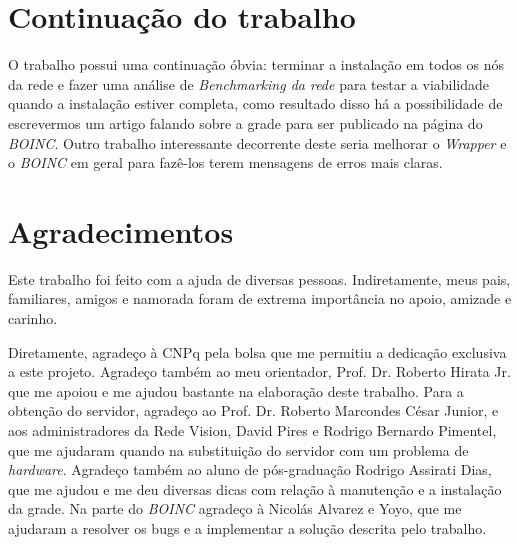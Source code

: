 \section{Continuação do trabalho}

O trabalho possui uma continuação óbvia: terminar a instalação em todos os nós da rede e fazer uma análise de \emph{Benchmarking da rede} para
testar a viabilidade quando a instalação estiver completa, como resultado disso há a possibilidade de
escrevermos um artigo falando sobre a grade para ser publicado na página do \emph{BOINC}. Outro trabalho interessante decorrente deste 
seria melhorar o \emph{Wrapper} e o \emph{BOINC} em geral para fazê-los terem mensagens de erros mais claras. 

\section{Agradecimentos}

Este trabalho foi feito com a ajuda de diversas pessoas. Indiretamente, meus pais, familiares, amigos e namorada foram de extrema importância 
no apoio, amizade e carinho. 

Diretamente, agradeço à CNPq pela bolsa que me permitiu a dedicação exclusiva a este projeto. Agradeço também ao meu orientador, 
Prof. Dr. Roberto Hirata Jr. que me apoiou e me ajudou bastante na elaboração deste trabalho. Para a obtenção do servidor,
agradeço ao Prof. Dr. Roberto Marcondes César Junior, e aos administradores da Rede Vision, David Pires e Rodrigo Bernardo Pimentel, 
que me ajudaram quando na substituição do servidor com um problema de \emph{hardware}. Agradeço também ao aluno de pós-graduação
Rodrigo Assirati Dias, que me ajudou e me deu diversas dicas com relação à manutenção e a instalação da grade. Na parte do \emph{BOINC}
agradeço à Nicolás Alvarez e Yoyo, que me ajudaram a resolver os bugs e a implementar a solução descrita pelo trabalho.



